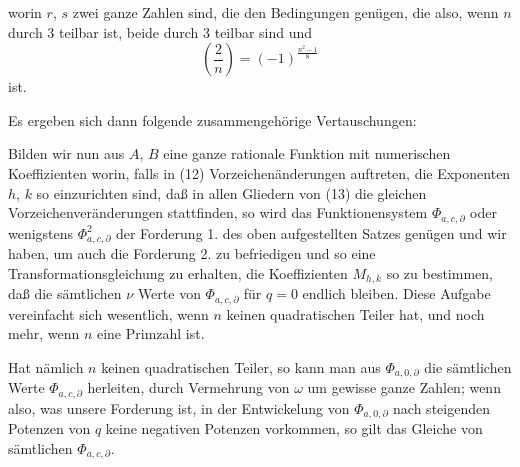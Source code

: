worin $r$, $s$ zwei ganze Zahlen sind, die den Bedingungen
genügen, die also, wenn $n$ durch 3 teilbar ist, beide durch 3
teilbar sind und
\[ \left(\frac{2}{n}\right) = (-1)^{\frac{n^2-1}{8}} \]
ist.

Es ergeben sich dann folgende zusammengehörige Vertauschungen:

Bilden wir nun aus $A$, $B$ eine ganze rationale Funktion mit
numerischen Koeffizienten
worin, falls in (12) Vorzeichenänderungen auftreten, die Exponenten
$h$, $k$ so einzurichten sind, daß in allen Gliedern von (13)
die gleichen Vorzeichenveränderungen stattfinden, so wird das
Funktionensystem $\Phi_{a,c,\partial}$ oder wenigstens $\Phi^2_{a,c,\partial}$ der Forderung 1.
des oben aufgestellten Satzes genügen und wir haben, um auch
die Forderung 2. zu befriedigen und so eine Transformationsgleichung zu erhalten, die Koeffizienten $M_{h,k}$ so zu bestimmen,
daß die sämtlichen $\nu$ Werte von $\Phi_{a,c,\partial}$ für $q=0$ endlich bleiben.
Diese Aufgabe vereinfacht sich wesentlich, wenn $n$ keinen quadratischen Teiler hat, und noch mehr, wenn $n$ eine Primzahl ist.

Hat nämlich $n$ keinen quadratischen Teiler, so kann man aus
$\Phi_{a,0,\partial}$ die sämtlichen Werte $\Phi_{a,c,\partial}$ herleiten, durch Vermehrung
von $\omega$ um gewisse ganze Zahlen; wenn also, was unsere Forderung ist, in der Entwickelung von $\Phi_{a,0,\partial}$ %
nach steigenden Potenzen
von $q$ keine negativen Potenzen vorkommen, so gilt das Gleiche
von sämtlichen $\Phi_{a,c,\partial}$.
